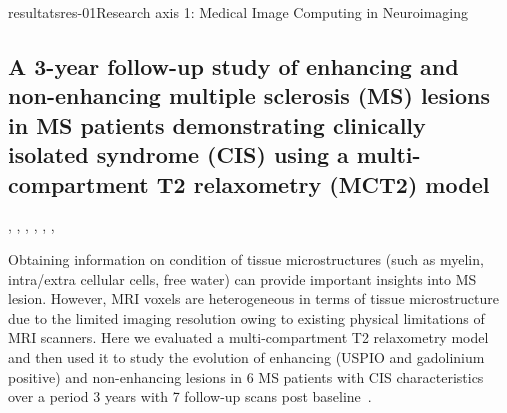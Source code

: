 \documentclass{ra2018}
\begin{document}
\begin{module}{resultats}{res-01}{Research axis 1: Medical Image Computing in Neuroimaging}
\subsection{A 3-year follow-up study of enhancing and non-enhancing multiple sclerosis (MS) lesions in MS patients demonstrating clinically isolated syndrome (CIS) using a multi-compartment T2 relaxometry (MCT2) model}
\begin{participants}
      , 
      ,
      ,
      ,
      ,
      ,
\end{participants}
Obtaining information on condition of tissue microstructures (such as myelin, intra/extra cellular cells, free water) can provide important insights into MS lesion. However, MRI voxels are heterogeneous in terms of tissue microstructure due to the limited imaging resolution owing to existing physical limitations of MRI scanners. Here we evaluated a multi-compartment T2 relaxometry model and then used it to study the evolution of enhancing (USPIO and gadolinium positive) and non-enhancing lesions in 6 MS patients with CIS characteristics over a period 3 years with 7 follow-up scans post baseline~\cite{chatterjee:hal-01821694}.


\end{module}
\end{document}
